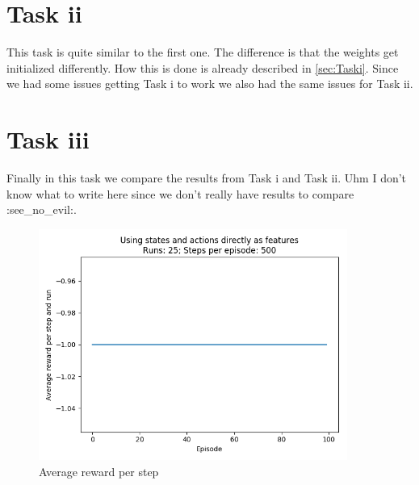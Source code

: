 \documentclass{article}
\begin{document}
	
	\section{Task ii}
	\label{sec:Taskii}
	This task is quite similar to the first one. The difference is that the weights get initialized differently. How this is done is already described in \autoref{sec:Taski}. Since we had some issues getting Task i to work we also had the same issues for Task ii. 
	
	
	\section{Task iii}
	Finally in this task we compare the results from Task i and Task ii. Uhm I don't know what to write here since we don't really have results to compare :see\_no\_evil:.
	
	\begin{figure}[h]
		\caption{Average reward per step}
		\label{fig:AverageReward}
		\includegraphics[width=0.9\textwidth]{plots/averageReward.png}
	\end{figure}
	
	
\end{document}
